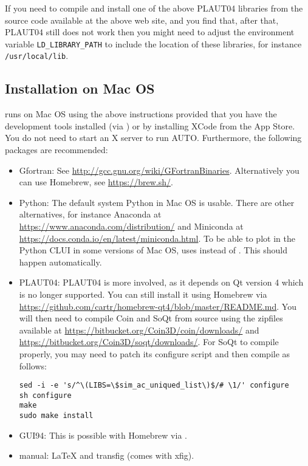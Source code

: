 \documentclass[12pt]{report}
\begin{document}
If you need to compile and install one of the above {\cal PLAUT04} libraries
from the source code available at the above web site, and you
find that, after that, {\cal PLAUT04} still does not work then you might need to
adjust the environment variable {\tt LD\_LIBRARY\_PATH} to include
the location of these libraries, for instance {\tt /usr/local/lib}.

\subsection{Installation on Mac OS}
\AUTO runs on Mac OS using the above instructions provided that
you have the development tools installed (via ) or by installing XCode from the App Store.
You do not need to start an X server to run AUTO.
Furthermore, the following packages are recommended:
\begin{itemize}
\item Gfortran: See \url{http://gcc.gnu.org/wiki/GFortranBinaries}.
Alternatively you can use Homebrew, see \url{https://brew.sh/}.
\item Python:
The default system Python in Mac OS is usable.
There are other alternatives, for instance Anaconda
at \url{https://www.anaconda.com/distribution/} and Miniconda
at \url{https://docs.conda.io/en/latest/miniconda.html}.
To be able to plot in the Python CLUI in some versions of Mac OS,
\AUTO uses  instead of .
This should happen automatically.
\item {\cal PLAUT04}: PLAUT04 is more involved, as it depends on Qt version 4
which is no longer supported. You can still install it using Homebrew via
\url{https://github.com/cartr/homebrew-qt4/blob/master/README.md}.
You will then need to compile Coin and SoQt from source using the
zipfiles available at
\url{https://bitbucket.org/Coin3D/coin/downloads/} and
\url{https://bitbucket.org/Coin3D/soqt/downloads/}.
For SoQt to compile properly, you may need to patch its configure script
and then compile as follows:
\begin{verbatim}
sed -i -e 's/^\(LIBS=\$sim_ac_uniqued_list\)$/# \1/' configure
sh configure
make
sudo make install
\end{verbatim}
\item GUI94: This is possible with Homebrew via .
\item manual: \LaTeX\xspace and transfig (comes with xfig).
\end{itemize}
\end{document}

